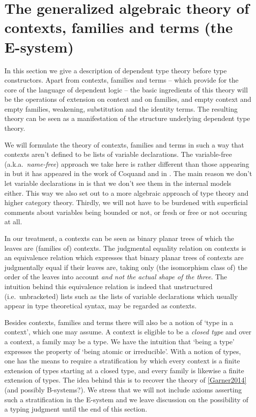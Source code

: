 \section{The generalized algebraic theory of contexts, families and terms (the E-system)}\label{tt}
In this section we give a description of dependent type theory before type
constructors. Apart from contexts, families and terms -- which provide for the
core of the language of dependent logic -- the basic ingredients
of this theory will be the operations of extension on context and on families, 
and empty context and empty families, weakening, substitution
and the identity terms. The resulting theory can be seen as a manifestation of the 
structure underlying dependent type theory.

We will
formulate the theory of contexts, families and terms in such a way that contexts aren't defined
to be lists of variable declarations. The variable-free (a.k.a.~\emph{name-free}) approach 
we take here is rather different than those appearing in 
\cite{hofmann1995extensional,TheBook} but it has appeared in the work of Coquand
and in \cite{Dybjer1996}.
The main reason we don't let variable declarations in is that we don't see them 
in the internal models either. This way we also set out to a more algebraic 
approach of type theory and higher category theory. Thirdly, we will not have to
be burdened with superficial comments about variables being bounded or not, or 
fresh or free or not occuring at all.

In our treatment, a contexts can be seen as binary
planar trees of which the leaves are (families of) contexts. 
The judgmental equality relation on contexts is an equivalence relation which 
expresses that binary planar
trees of contexts are judgmentally equal if their leaves are, taking only
(the isomorphism class of) 
the order of the leaves into account \emph{and not the actual shape of the three}.
The intuition behind this equivalence relation is indeed that unstructured
(i.e.~unbracketed) lists such as the lists of variable declarations which
usually appear in type theoretical syntax, may be regarded as contexts.

Besides contexts, families and terms there will also be a notion of `type in
a context', which one may assume.
A context is eligible to be a \emph{closed type} and over a context, a family
may be a type. We have the intuition that `being a type'
expresses the property of `being atomic or irreducible'. With a notion of types,
one has the means to require a stratification by which every context is a finite
extension of types starting at a closed type, and every family is likewise a
finite extension of types. The idea behind this is to recover the theory of
\autoref{Garner2014} {\color{red}(and possibly B-systems?)}. We stress that
we will not include axioms asserting such a stratification in the E-system
and we leave discussion on the possibility of a typing judgment until the
end of this section. 


